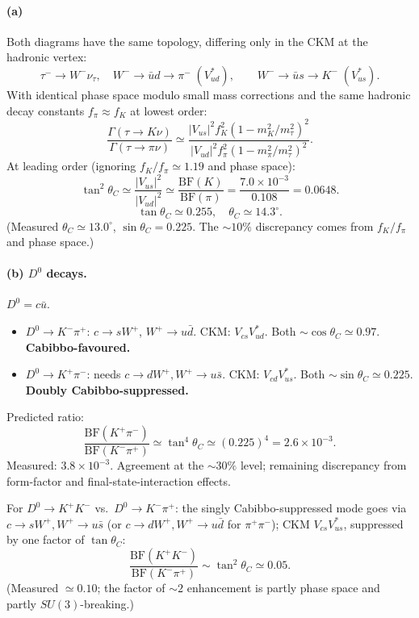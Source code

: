 \documentclass[11pt]{article}
\begin{document}
\paragraph{(a)} Both diagrams have the same topology, differing only in the CKM at the hadronic vertex:
\[
\tau^-\to W^-\nu_\tau,\quad W^-\to\bar u d \to\pi^-\;(V_{ud}^{*}),\qquad W^-\to\bar u s\to K^-\;(V_{us}^{*}).
\]
With identical phase space modulo small mass corrections and the same hadronic decay constants $f_\pi\approx f_K$ at lowest order:
\[
\frac{\Gamma(\tau\to K\nu)}{\Gamma(\tau\to\pi\nu)}\simeq\frac{|V_{us}|^{2}f_K^{2}(1-m_K^{2}/m_\tau^{2})^{2}}{|V_{ud}|^{2}f_\pi^{2}(1-m_\pi^{2}/m_\tau^{2})^{2}}.
\]
At leading order (ignoring $f_K/f_\pi\simeq 1.19$ and phase space):
\[
\tan^{2}\theta_C\simeq\frac{|V_{us}|^{2}}{|V_{ud}|^{2}}\simeq\frac{\mathrm{BF}(K)}{\mathrm{BF}(\pi)}=\frac{7.0\times 10^{-3}}{0.108}=0.0648.
\]
\[
\boxed{\;\tan\theta_C\simeq 0.255,\quad\theta_C\simeq 14.3^\circ.\;}
\]
(Measured $\theta_C\simeq 13.0^\circ$, $\sin\theta_C=0.225$. The $\sim 10\%$ discrepancy comes from $f_K/f_\pi$ and phase space.)

\paragraph{(b) $D^0$ decays.} $D^0=c\bar u$.
\begin{itemize}[itemsep=1pt]
\item $D^0\to K^-\pi^+$: $c\to s W^+$, $W^+\to u\bar d$. CKM: $V_{cs}V_{ud}^{*}$. Both $\sim\cos\theta_C\simeq 0.97$. \textbf{Cabibbo-favoured.}
\item $D^0\to K^+\pi^-$: needs $c\to d W^+,W^+\to u\bar s$. CKM: $V_{cd}V_{us}^{*}$. Both $\sim\sin\theta_C\simeq 0.225$. \textbf{Doubly Cabibbo-suppressed.}
\end{itemize}
Predicted ratio:
\[
\frac{\mathrm{BF}(K^+\pi^-)}{\mathrm{BF}(K^-\pi^+)}\simeq\tan^{4}\theta_C\simeq(0.225)^{4}=2.6\times 10^{-3}.
\]
Measured: $3.8\times 10^{-3}$. Agreement at the $\sim 30\%$ level; remaining discrepancy from form-factor and final-state-interaction effects.

For $D^0\to K^+K^-$ vs.\ $D^0\to K^-\pi^+$: the singly Cabibbo-suppressed mode goes via $c\to s W^+,W^+\to u\bar s$ (or $c\to d W^+,W^+\to u\bar d$ for $\pi^+\pi^-$); CKM $V_{cs}V_{us}^{*}$, suppressed by one factor of $\tan\theta_C$:
\[
\frac{\mathrm{BF}(K^+K^-)}{\mathrm{BF}(K^-\pi^+)}\sim\tan^{2}\theta_C\simeq 0.05.
\]
(Measured $\simeq 0.10$; the factor of $\sim 2$ enhancement is partly phase space and partly $SU(3)$-breaking.)
\end{document}
